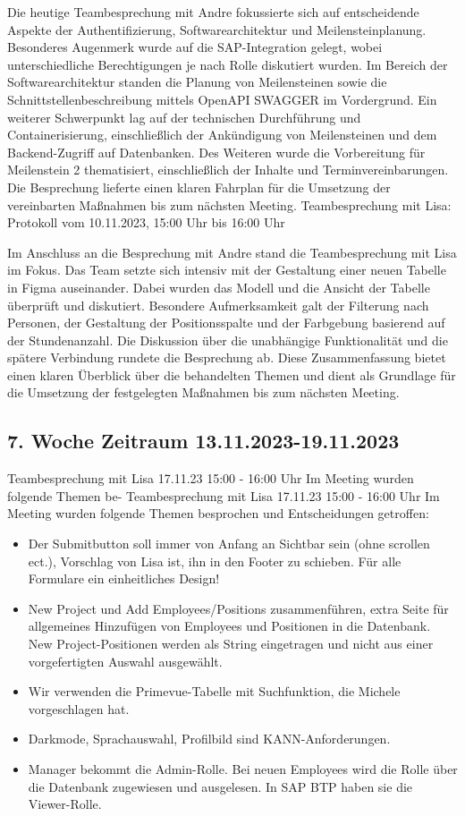 \documentclass{article}
\begin{document}
Die heutige Teambesprechung mit Andre fokussierte sich auf entscheidende
Aspekte der Authentifizierung, Softwarearchitektur und Meilensteinplanung.
Besonderes Augenmerk wurde auf die SAP-Integration gelegt, wobei
unterschiedliche Berechtigungen je nach Rolle diskutiert wurden. Im Bereich der
Softwarearchitektur standen die Planung von Meilensteinen sowie die
Schnittstellenbeschreibung mittels OpenAPI SWAGGER im Vordergrund. Ein weiterer
Schwerpunkt lag auf der technischen Durchführung und Containerisierung,
einschließlich der Ankündigung von Meilensteinen und dem Backend-Zugriff auf
Datenbanken. Des Weiteren wurde die Vorbereitung für Meilenstein 2
thematisiert, einschließlich der Inhalte und Terminvereinbarungen. Die
Besprechung lieferte einen klaren Fahrplan für die Umsetzung der vereinbarten
Maßnahmen bis zum nächsten Meeting. Teambesprechung mit Lisa: Protokoll vom
10.11.2023, 15:00 Uhr bis 16:00 Uhr

Im Anschluss an die Besprechung mit Andre stand die Teambesprechung mit Lisa im
Fokus. Das Team setzte sich intensiv mit der Gestaltung einer neuen Tabelle in
Figma auseinander. Dabei wurden das Modell und die Ansicht der Tabelle
überprüft und diskutiert. Besondere Aufmerksamkeit galt der Filterung nach
Personen, der Gestaltung der Positionsspalte und der Farbgebung basierend auf
der Stundenanzahl. Die Diskussion über die unabhängige Funktionalität und die
spätere Verbindung rundete die Besprechung ab. Diese Zusammenfassung bietet
einen klaren Überblick über die behandelten Themen und dient als Grundlage für
die Umsetzung der festgelegten Maßnahmen bis zum nächsten Meeting.

\subsection{7. Woche Zeitraum 13.11.2023-19.11.2023}
Teambesprechung mit Lisa 17.11.23 15:00 - 16:00 Uhr Im Meeting wurden folgende Themen be-
Teambesprechung mit Lisa 17.11.23 15:00 - 16:00 Uhr
    Im Meeting wurden folgende Themen besprochen und Entscheidungen getroffen: 
    \begin{itemize}
        \item Der Submitbutton soll immer von Anfang an Sichtbar sein (ohne scrollen ect.), Vorschlag von Lisa ist, ihn in den Footer zu schieben. Für alle Formulare ein einheitliches Design!
        \item 	New Project und Add Employees/Positions zusammenführen, extra Seite für allgemeines Hinzufügen von Employees und Positionen in die Datenbank. New Project-Positionen werden als String eingetragen und nicht aus einer vorgefertigten Auswahl ausgewählt.
        \item 	Wir verwenden die Primevue-Tabelle mit Suchfunktion, die Michele vorgeschlagen hat.
        \item 	Darkmode, Sprachauswahl, Profilbild sind KANN-Anforderungen.
        \item 	Manager bekommt die Admin-Rolle. Bei neuen Employees wird die Rolle über die Datenbank zugewiesen und ausgelesen. In SAP BTP haben sie die Viewer-Rolle.
    \end{itemize}
\end{document}
